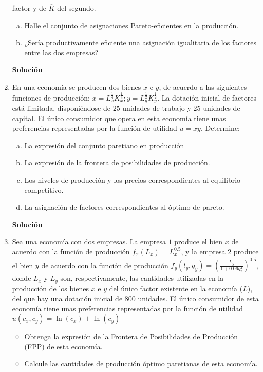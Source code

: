 \documentclass[10pt,a4paper]{article}
\begin{document}
\begin{enumerate}
	factor y de $\overline{K}$ del segundo.
			\begin{enumerate}[a)]
				\item Halle el conjunto de asignaciones Pareto-eficientes en la producción.
				\item ¿Sería productivamente eficiente una asignación igualitaria de los factores entre las dos empresas?
			\end{enumerate}
		\textbf{\LARGE Solución}\\
			
	\item En una economía se producen dos bienes $x$ e $y$, de acuerdo a las siguientes funciones de producción: $x = L_{x}^{\frac{1}{4}}K_{x}^{\frac{1}{4}}; y = L_{y}^{\frac{1}{2}}K_{y}^{\frac{1}{2}}$. La dotación inicial de factores está limitada, disponiéndose de $25$ unidades de trabajo y $25$ unidades de capital. El único consumidor que opera en esta economía tiene unas preferencias representadas por la función de utilidad $u = xy$. Determine:
			\begin{enumerate}[a)]
				\item La expresión del conjunto paretiano en producción
				\item La expresión de la frontera de posibilidades de producción.
				\item Los niveles de producción y los precios correspondientes al equilibrio competitivo.
				\item La asignación de factores correspondientes al óptimo de pareto.
			\end{enumerate}
		\textbf{\LARGE Solución}\\
			
	\item Sea una economía con dos empresas. La empresa $1$ produce el bien $x$ de acuerdo con la función de producción $f_x(L_x)=L_{x}^{0.5}$, y la empresa $2$ produce el bien $y$ de acuerdo con la función de producción $f_y(l_y, q_y)=\left( \frac{L_y}{1+0.06q_{x}^{2}}\right)^{0.5}$, donde $L_x$ y $L_y$ son, respectivamente, las cantidades utilizadas en la producción de los bienes $x$ e $y$ del único factor existente en la economía ($L$), del que hay una dotación inicial de 800 unidades. El único consumidor de esta economía tiene unas preferencias representadas por la función de utilidad $u\left( c_x, c_y\right) = \ln(c_x) + \ln(c_y)$
			\begin{itemize}
				\item Obtenga la expresión de la Frontera de Posibilidades de Producción (FPP) de esta economía.
				\item Calcule las cantidades de producción óptimo paretianas de esta economía.

\end{itemize}
\end{enumerate}
\end{document}
